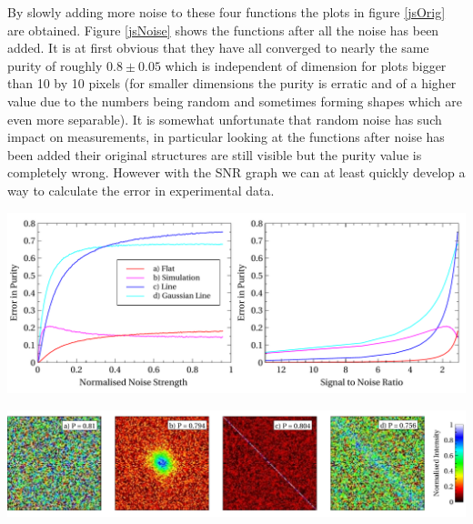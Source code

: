 By slowly adding more noise to these four functions the plots in figure \ref{jsOrig} are obtained. Figure \ref{jsNoise} shows the functions after all the noise has been added. It is at first obvious that they have all converged to nearly the same purity of roughly $0.8\pm0.05$ which is independent of dimension for plots bigger than 10 by 10 pixels (for smaller dimensions the purity is erratic and of a higher value due to the numbers being random and sometimes forming shapes which are even more separable). It is somewhat unfortunate that random noise has such impact on measurements, in particular looking at the functions after noise has been added their original structures are still visible but the purity value is completely wrong. However with the SNR graph we can at least quickly develop a way to calculate the error in experimental data.  

\begingroup
\centering
    \includegraphics[width=16cm]{res/theory/purityError.pdf}
 \label{noiseGraph}
\endgroup

\begingroup
\centering
    \includegraphics[width=17cm]{res/theory/js_noise.pdf}
 \label{jsNoise}
\endgroup


